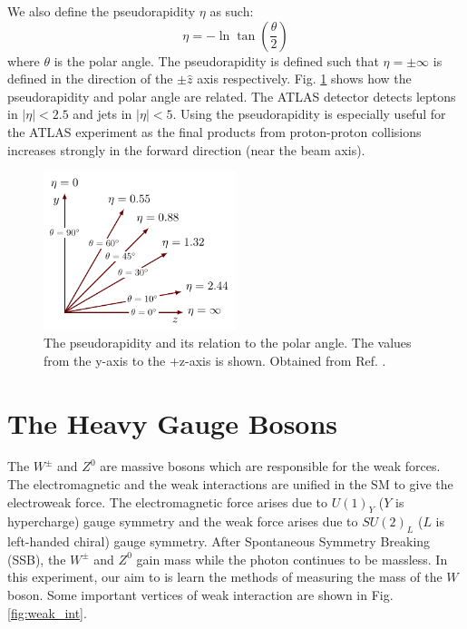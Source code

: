\documentclass[a4paper]{report}
\numberwithin{equation}{section}
\begin{document}
We also define the pseudorapidity $\eta$ as such: 
\begin{equation}
	\eta = -\ln \tan (\frac{\theta}{2})
\end{equation}
where $\theta$ is the polar angle. The pseudorapidity is defined such that $\eta = \pm\infty$ is defined in the direction of the 
$\pm \hat{z}$ axis respectively. Fig. \ref{fig:pseudorap} shows how the pseudorapidity and polar angle are related. The ATLAS 
detector detects leptons in $|\eta| < 2.5$ and jets in $|\eta| < 5$.
Using the pseudorapidity is especially useful for the ATLAS experiment as the final products from proton-proton collisions increases 
strongly in the forward direction (near the beam axis). 

\begin{figure}[htpb]
    \centering
    \includegraphics[width=0.5\textwidth]{pseudorapidity.pdf}
    \caption{The pseudorapidity and its relation to the polar angle. The values from the y-axis to the +z-axis is shown. 
	Obtained from Ref. \cite{Izaak2017}.}
    \label{fig:pseudorap}
\end{figure}


\section{The Heavy Gauge Bosons} \label{sec:gauge_bosons}

The $W^{\pm}$ and $Z^0$ are massive bosons which are responsible for the weak forces. The electromagnetic and the weak interactions are unified in the SM to give the electroweak force. The electromagnetic force arises due to $U(1)_{Y}$ ($Y$ is hypercharge) gauge symmetry and the weak force arises due to $SU(2)_L$ ($L$ is left-handed chiral) gauge symmetry. After Spontaneous Symmetry Breaking (SSB), the $W^{\pm}$ and $Z^0$ gain mass while the photon continues to be massless. In this experiment, our aim to is learn the methods of measuring the mass of the $W$ boson. Some important vertices of weak interaction are shown in Fig. \ref{fig:weak_int}.
\end{document}
